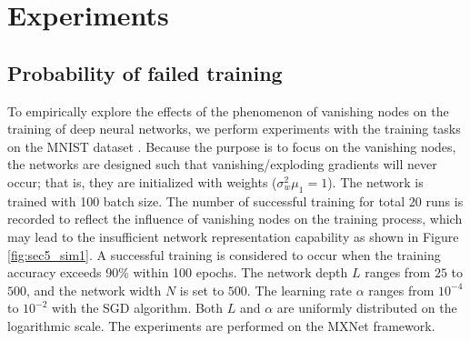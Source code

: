 \chapter{Experiments} \label{experiments}






\section {Probability of failed training}

To empirically explore the effects of the phenomenon of vanishing nodes on the training of deep neural
networks, we perform experiments with the training tasks on the MNIST dataset \cite{mnist}.
Because the purpose is to focus on the  vanishing nodes, the networks are designed such that
vanishing/exploding gradients will never occur; that is, they are initialized with weights
($\sigma_w^2\mu_1=1$).
The network is trained with 100 batch size.
The number of successful training for total 20 runs is recorded to reflect the influence of vanishing
nodes on the training process, which may lead to the insufficient network representation capability
as shown in Figure \ref{fig:sec5_sim1}.
A successful training is considered to occur when the training accuracy exceeds 90\% within 100 epochs. 
The network depth $L$ ranges from $25$ to $500$, and the network width $N$ is set to $500$.
The learning rate $\alpha$ ranges from $10^{-4}$ to $10^{-2}$ with the SGD algorithm.
Both $L$ and $\alpha$ are uniformly distributed on the logarithmic scale.
The experiments are performed on the MXNet framework\cite{mxnet}.

